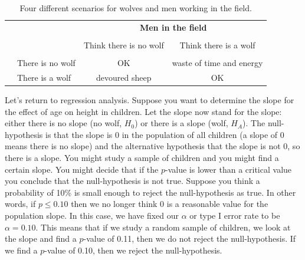 \documentclass[]{report}\usepackage[]{graphicx}\usepackage[]{color}
\begin{document}
\begin{table}[ht]
\centering
\begin{tabular}{l l c c}
& & \multicolumn{2}{c}{\textbf{Men in the field}} \\
  \cline{3-4}
\vspace{-3.7mm} \\
& & Think there is no wolf  &  Think there is a wolf \\
  \cline{2-4}
\vspace{-3.7mm} \\
& There is no wolf & OK &  waste of time and energy \\
\raisebox{1.5ex}{\textbf{Truth}} & There is a wolf & devoured sheep & OK \\
  \cline{2-4}
\end{tabular}
\caption{Four different scenarios for wolves and men working in the field.}
\label{fig:Aesop}
\end{table}





Let's return to regression analysis. Suppose you want to determine the slope for the effect of age on height in children. Let the slope now stand for the slope: either there is no slope (no wolf, $H_0$) or there is a slope (wolf, $H_A$). The null-hypothesis is that the slope is 0 in the population of all children (a slope of 0 means there is no slope) and the alternative hypothesis that the slope is not 0, so there is a slope. You might study a sample of children and you might find a certain slope. You might decide that if the $p$-value is lower than a critical value you conclude that the null-hypothesis is not true. Suppose you think a probability of 10\% is small enough to reject the null-hypothesis as true. In other words, if $p \leq 0.10$ then we no longer think 0 is a reasonable value for the population slope. In this case, we have fixed our $\alpha$ or type I error rate to be $\alpha=0.10$. This means that if we study a random sample of children, we look at the slope and find a $p$-value of 0.11, then we do not reject the null-hypothesis. If we find a $p$-value of 0.10, then we reject the null-hypothesis.
\end{document}
